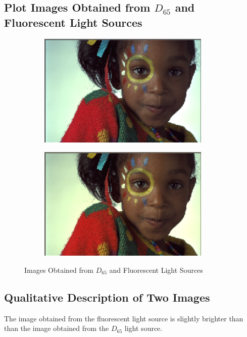 \documentclass{article}
\begin{document}
\subsection{Plot Images Obtained from $D_{65}$ and Fluorescent Light Sources}
	\begin{figure}[h]
		\begin{subfigure}{0.5\textwidth}
			\includegraphics[width=0.9\textwidth]{gcimgd65.png}
		\end{subfigure}
		\begin{subfigure}{0.5\textwidth}
			\includegraphics[width=0.9\textwidth]{gcimgflu.png}
		\end{subfigure}
		\caption{Images Obtained from $D_{65}$ and Fluorescent Light Sources}
	\end{figure}

\subsection{Qualitative Description of Two Images}
	The image obtained from the fluorescent light source is slightly brighter
	than than the image obtained from the $D_{65}$ light source.
\end{document}
